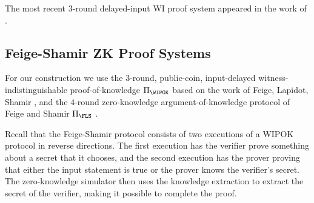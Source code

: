 The most recent $3$-round delayed-input WI proof system appeared in the work of \cite{C:COSV16}.

\subsection{Feige-Shamir ZK Proof Systems}\label{fls} For our construction we use the $3$-round, public-coin, input-delayed witness-indistinguishable proof-of-knowledge $\Pi_\WIPOK$ based on the work of Feige, Lapidot, Shamir \cite{FLS99}, and the $4$-round zero-knowledge argument-of-knowledge protocol of Feige and Shamir $\Pi_\FLS$ \cite{STOC:FeiSha90}.

Recall that the Feige-Shamir protocol consists of two executions of a WIPOK protocol in reverse directions. The first execution has the verifier prove something about a secret that it chooses, and the second execution has the prover proving that either the input statement is true or the prover knows the verifier's secret. The zero-knowledge simulator then uses the knowledge extraction to extract the secret of the verifier, making it possible to complete the proof.

